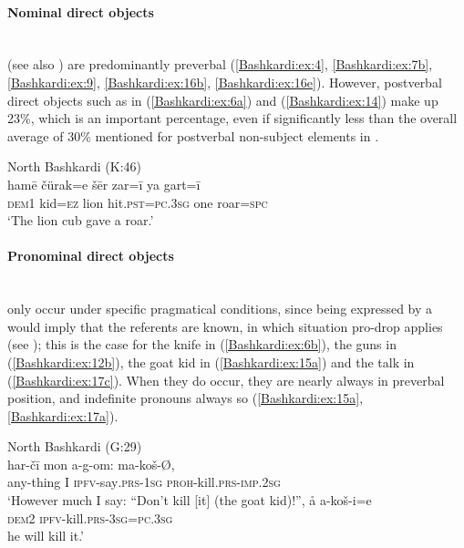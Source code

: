 \documentclass[output=paper,colorlinks,citecolor=brown]{langscibook}
\begin{document}
\paragraph{Nominal direct objects}\label{Bashkardi:ss:2.4.2.1}\mbox{} \\

 (see also ) are predominantly preverbal (\ref{Bashkardi:ex:4}, \ref{Bashkardi:ex:7b}, \ref{Bashkardi:ex:9}, \ref{Bashkardi:ex:16b}, \ref{Bashkardi:ex:16e}). However, postverbal direct objects such as in (\ref{Bashkardi:ex:6a}) and (\ref{Bashkardi:ex:14}) make up 23\%, which is an important percentage, even if significantly less than the overall average of 30\% mentioned for postverbal non-subject elements in .

\ea\label{Bashkardi:ex:14}
North Bashkardi (K:46) \\
\gll hamē čürak=e šēr zar=ī ya gart=ī \\
\textsc{dem1} kid\textsc{=ez} lion hit\textsc{.pst}\textsc{=pc.3sg} one roar\textsc{=spc} \\
\glt `The lion cub gave a roar.'
\z

\paragraph{Pronominal direct objects}\label{Bashkardi:ss:2.4.2.2}\mbox{} \\

 only occur under specific pragmatical conditions, since being expressed by a  would imply that the referents are known, in which situation pro-drop applies (see ); this is the case for the knife in (\ref{Bashkardi:ex:6b}), the guns in (\ref{Bashkardi:ex:12b}), the goat kid in (\ref{Bashkardi:ex:15a}) and the talk in (\ref{Bashkardi:ex:17c}). When they do occur, they are nearly always in preverbal position, and indefinite pronouns always so (\ref{Bashkardi:ex:15a}, \ref{Bashkardi:ex:17a}).

\ea
North Bashkardi (G:29) \\
\ea\label{Bashkardi:ex:15a}
\gll har-čī mon a-g-om: ma-koš\textup{-\O}, \\
any-thing I \textsc{ipfv-}say\textsc{.prs}\textsc{-1sg} \textsc{proh-}kill\textsc{.prs}\textsc{-imp}\textsc{.2sg} \\
\glt `However much I say: ``Don't kill [it] (the goat kid)!'',
\ex\label{Bashkardi:ex:15b}
\gll å a-koš-i=e \\
\textsc{dem2} \textsc{ipfv-}kill\textsc{.prs}\textsc{-3sg}\textsc{=pc.3sg} \\
\glt  he will kill it.'
\z
\z
\end{document}

